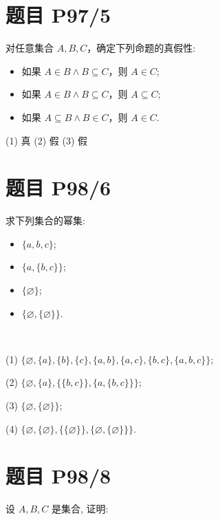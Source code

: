 \section*{题目 P97/5}

对任意集合 $A,B,C$，确定下列命题的真假性:

\begin{itemize}[leftmargin=1.5cm]
	\item[(1)] 如果 $A\in B \wedge B \subseteq C$，则 $A\in C$;
	\item[(2)] 如果 $A\in B \wedge B \subseteq C$，则 $A\subseteq C$;
	\item[(3)] 如果 $A\subseteq B \wedge B \in C$，则 $A\in C$.
	
\end{itemize}

\begin{solution}
	(1) 真
	(2) 假
	(3) 假
\end{solution}

\section*{题目 P98/6}

求下列集合的幂集:

\begin{itemize}[leftmargin=1.5cm]
	\item[(1)] $\{a,b,c\}$;
	\item[(2)] $\{a,\{b,c\}\}$;
	\item[(3)] $\{\varnothing\}$;
	\item[(4)] $\{\varnothing,\{\varnothing\}\}$.
	
\end{itemize}

\begin{solution}\
	
	(1) $\{\varnothing,\{a\},\{b\},\{c\},\{a,b\},\{a,c\},\{b,c\},\{a,b,c\}\}$;
	
	(2) $\{\varnothing,\{a\},\{\{b,c\}\},\{a,\{b,c\}\}\}$; 
	
	(3) $\{\varnothing,\{\varnothing\}\}$; 
	
	(4) $\{\varnothing,\{\varnothing\},\{\{\varnothing\}\},\{\varnothing,\{\varnothing\}\}\}$.
\end{solution}

\section*{题目 P98/8}

设 $A,B,C$ 是集合, 证明:

